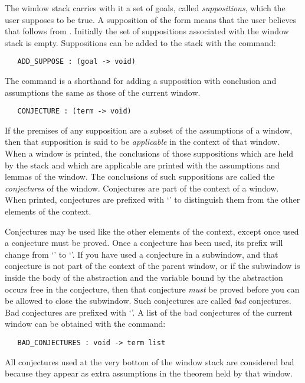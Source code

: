 The window stack carries with it a set of goals, called 
{\it suppositions},
which the user supposes to be true.
A supposition of the form  means that the user believes that
 follows from .
Initially the set of suppositions associated with the window stack is empty.
Suppositions can be added to the stack with the command:
\begin{boxed}\begin{verbatim}
   ADD_SUPPOSE : (goal -> void)
\end{verbatim}\end{boxed}
The command  is a shorthand for adding a supposition with
conclusion  and assumptions the same as those of the current window.
\begin{boxed}\begin{verbatim}
   CONJECTURE : (term -> void)
\end{verbatim}\end{boxed}

If the premises of any supposition are a subset of the assumptions of a window,
then that supposition is said to be
{\it applicable}\/ in the context of that
window.
When a window is printed, the conclusions of those suppositions which
are held by the stack and which are applicable are printed with the 
assumptions and lemmas of the window.
The conclusions of such suppositions are called the 
{\it conjectures}\/ of the
window.
Conjectures are part of the context of a window.
When printed, conjectures are prefixed with
`' to distinguish them
from the other elements of the context.

Conjectures may be used like the other elements of the context, except once
used a conjecture must be proved.
Once a conjecture has been used, its prefix will change from `' to
`\ml{\$}'.
If you have used a conjecture in a subwindow, and that conjecture is not
part of the context of the parent window,
or if the subwindow is inside the body of the abstraction and the variable
bound by the abstraction occurs free in the conjecture,
then that conjecture {\it must\/}
be proved before you can be allowed to close the subwindow.
Such conjectures are called {\it bad\/}
conjectures.
Bad conjectures are prefixed with
`'.
A list of the bad conjectures of the current window can be obtained with 
the command:
\begin{boxed}\begin{verbatim}
   BAD_CONJECTURES : void -> term list
\end{verbatim}\end{boxed}
All conjectures used at the very bottom of the window stack are considered bad
because they appear as extra assumptions in the theorem held by that window.


